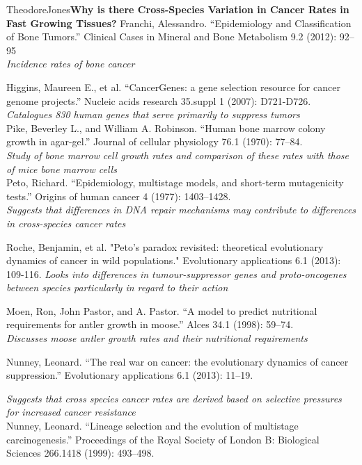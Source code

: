 \documentclass[12pt,letterpaper]{article}
\begin{document}
\begin{mla}{Theodore}{Jones}{}{}{}{\textbf{Why is there Cross-Species Variation in Cancer Rates in Fast Growing Tissues?}}
Franchi, Alessandro. “Epidemiology and Classification of Bone Tumors.” Clinical Cases in Mineral and Bone Metabolism 9.2 (2012): 92–95\\

\emph{Incidence rates of bone cancer}

Higgins, Maureen E., et al. “CancerGenes: a gene selection resource for cancer genome projects.” Nucleic acids research 35.suppl 1 (2007): D721-D726. \\

\emph{Catalogues 830 human genes that serve primarily to suppress tumors}\\

Pike, Beverley L., and William A. Robinson. “Human bone marrow colony growth in agar-gel.” Journal of cellular physiology 76.1 (1970): 77–84. \\

\emph{Study of bone marrow cell growth rates and comparison of these rates with those of mice bone marrow cells} \\

Peto, Richard. “Epidemiology, multistage models, and short-term mutagenicity tests.” Origins of human cancer 4 (1977): 1403–1428.\\
\emph{Suggests that differences in DNA repair mechanisms may contribute to differences in cross-species cancer rates}

Roche, Benjamin, et al. "Peto's paradox revisited: theoretical evolutionary dynamics of cancer in wild populations." Evolutionary applications 6.1 (2013): 109-116.
\emph{Looks into differences in tumour-suppressor genes and proto-oncogenes between species particularly in regard to their action}

Moen, Ron, John Pastor, and A. Pastor. “A model to predict nutritional requirements for antler growth in moose.” Alces 34.1 (1998): 59–74. \\
\emph{Discusses moose antler growth rates and their nutritional requirements}

Nunney, Leonard. “The real war on cancer: the evolutionary dynamics of cancer suppression.” Evolutionary applications 6.1 (2013): 11–19.

\emph{Suggests that cross species cancer rates are derived based on selective pressures for increased cancer resistance} \\

Nunney, Leonard. “Lineage selection and the evolution of multistage carcinogenesis.” Proceedings of the Royal Society of London B: Biological Sciences 266.1418 (1999): 493–498. \\


\end{mla}
\end{document}
